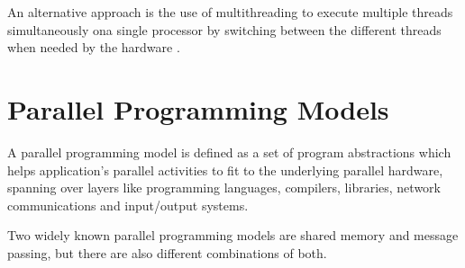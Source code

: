 An alternative approach is the use of multithreading to execute multiple threads simultaneously ona single processor by switching between the different threads when needed by the hardware \parencite{internet9}.

\section{Parallel Programming Models}\label{chap:parPrgModels}

A parallel programming model is defined as a set of program abstractions which helps application's parallel activities to fit to the underlying parallel hardware, spanning over layers like programming languages, compilers, libraries, network communications and input/output systems.

Two widely known parallel programming models are shared memory and message passing, but there are also different combinations of both.


